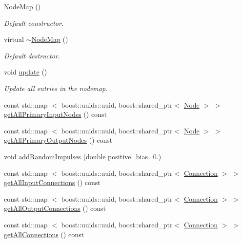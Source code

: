 \begin{DoxyCompactItemize}
\item 
\hyperlink{classcryomesh_1_1components_1_1NodeMap_a007c30a64d4e67fd13d4e17564a36efd}{\-Node\-Map} ()
\begin{DoxyCompactList}\small\item\em \-Default constructor. \end{DoxyCompactList}\item 
virtual \hyperlink{classcryomesh_1_1components_1_1NodeMap_a0a69ff4da08fab9ce067c833287168cd}{$\sim$\-Node\-Map} ()
\begin{DoxyCompactList}\small\item\em \-Default destructor. \end{DoxyCompactList}\item 
void \hyperlink{classcryomesh_1_1components_1_1NodeMap_ae85cc8ab692efb960c599d35d462455b}{update} ()
\begin{DoxyCompactList}\small\item\em \-Update all entries in the nodemap. \end{DoxyCompactList}\item 
const std\-::map\*
$<$ boost\-::uuids\-::uuid, \*
boost\-::shared\-\_\-ptr$<$ \hyperlink{classcryomesh_1_1components_1_1Node}{\-Node} $>$ $>$ \hyperlink{classcryomesh_1_1components_1_1NodeMap_a7e5fa285811aed1d2e9c32138b3375af}{get\-All\-Primary\-Input\-Nodes} () const 
\item 
const std\-::map\*
$<$ boost\-::uuids\-::uuid, \*
boost\-::shared\-\_\-ptr$<$ \hyperlink{classcryomesh_1_1components_1_1Node}{\-Node} $>$ $>$ \hyperlink{classcryomesh_1_1components_1_1NodeMap_a4b008a802aaee265c5b92fef2a6d2725}{get\-All\-Primary\-Output\-Nodes} () const 
\item 
void \hyperlink{classcryomesh_1_1components_1_1NodeMap_ad4b42918273af05d2ca54120f4539b24}{add\-Random\-Impulses} (double positive\-\_\-bias=0.)
\item 
const std\-::map\*
$<$ boost\-::uuids\-::uuid, \*
boost\-::shared\-\_\-ptr$<$ \hyperlink{classcryomesh_1_1components_1_1Connection}{\-Connection} $>$ $>$ \hyperlink{classcryomesh_1_1components_1_1NodeMap_af1efc85da645cb2e0b41d8e9cb80eb64}{get\-All\-Input\-Connections} () const 
\item 
const std\-::map\*
$<$ boost\-::uuids\-::uuid, \*
boost\-::shared\-\_\-ptr$<$ \hyperlink{classcryomesh_1_1components_1_1Connection}{\-Connection} $>$ $>$ \hyperlink{classcryomesh_1_1components_1_1NodeMap_a8848e745f7a85f781f9f9e8bbe8e0ffc}{get\-All\-Output\-Connections} () const 
\item 
const std\-::map\*
$<$ boost\-::uuids\-::uuid, \*
boost\-::shared\-\_\-ptr$<$ \hyperlink{classcryomesh_1_1components_1_1Connection}{\-Connection} $>$ $>$ \hyperlink{classcryomesh_1_1components_1_1NodeMap_af85f9c069d1ee5ca3898d15b576acc11}{get\-All\-Connections} () const 
\end{DoxyCompactItemize}
